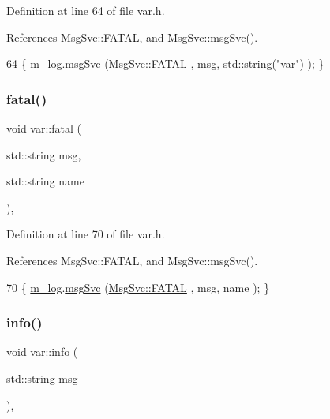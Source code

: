 Definition at line 64 of file var.\+h.



References Msg\+Svc\+::\+F\+A\+T\+AL, and Msg\+Svc\+::msg\+Svc().


\begin{DoxyCode}
64 \{ \hyperlink{classvar_a5dfdc5180270038b686ad3013874a026}{m\_log}.\hyperlink{classMsgSvc_ad25f18047920cc59a314e5098259711c}{msgSvc} (\hyperlink{classMsgSvc_ae671eb7301996cd049d2da8a65925926a59c73cb29edfc9cdf35845e2b1301363}{MsgSvc::FATAL}   , msg, std::string(\textcolor{stringliteral}{"var"}) ); \}
\end{DoxyCode}
\mbox{\label{classvar_af190a03a038835391edf1b1173e117ab}} 
\subsubsection{\texorpdfstring{fatal()}{fatal()}\hspace{0.1cm}{\footnotesize\ttfamily [2/2]}}
{\footnotesize\ttfamily void var\+::fatal (\begin{DoxyParamCaption}\item[{std\+::string}]{msg,  }\item[{std\+::string}]{name }\end{DoxyParamCaption})\hspace{0.3cm}{\ttfamily [inline]}, {\ttfamily [private]}}



Definition at line 70 of file var.\+h.



References Msg\+Svc\+::\+F\+A\+T\+AL, and Msg\+Svc\+::msg\+Svc().


\begin{DoxyCode}
70 \{ \hyperlink{classvar_a5dfdc5180270038b686ad3013874a026}{m\_log}.\hyperlink{classMsgSvc_ad25f18047920cc59a314e5098259711c}{msgSvc} (\hyperlink{classMsgSvc_ae671eb7301996cd049d2da8a65925926a59c73cb29edfc9cdf35845e2b1301363}{MsgSvc::FATAL}   , msg, name ); \}
\end{DoxyCode}
\mbox{\label{classvar_a6ad63ffe8ea9495201a7b2a824547518}} 
\subsubsection{\texorpdfstring{info()}{info()}\hspace{0.1cm}{\footnotesize\ttfamily [1/2]}}
{\footnotesize\ttfamily void var\+::info (\begin{DoxyParamCaption}\item[{std\+::string}]{msg }\end{DoxyParamCaption})\hspace{0.3cm}{\ttfamily [inline]}, {\ttfamily [private]}}



